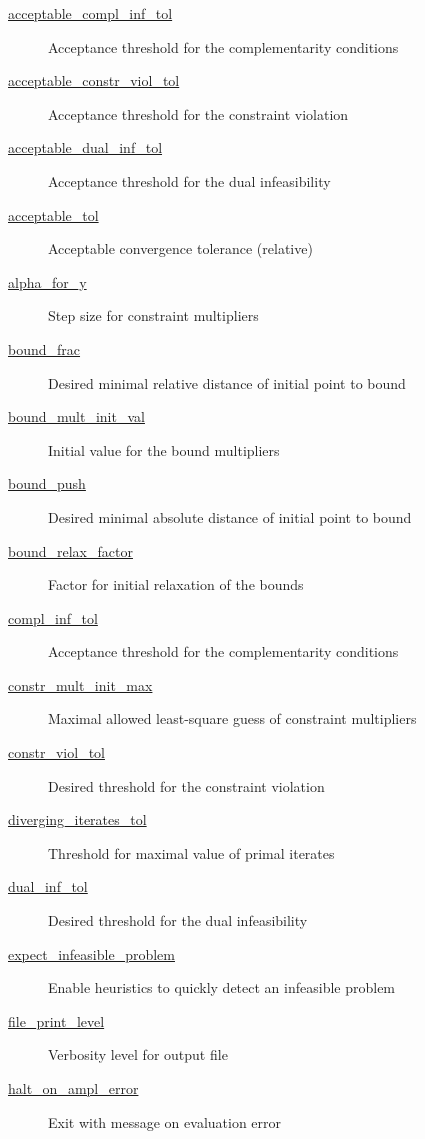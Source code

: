 \begin{description}
\item[{\hyperref[sec:acceptable_compl_inf_tol]{acceptable\_compl\_inf\_tol}}] Acceptance threshold for the complementarity conditions
\item[{\hyperref[sec:acceptable_constr_viol_tol]{acceptable\_constr\_viol\_tol}}] Acceptance threshold for the constraint violation
\item[{\hyperref[sec:acceptable_dual_inf_tol]{acceptable\_dual\_inf\_tol}}] Acceptance threshold for the dual infeasibility
\item[{\hyperref[sec:acceptable_tol]{acceptable\_tol}}] Acceptable convergence tolerance (relative)
\item[{\hyperref[sec:alpha_for_y]{alpha\_for\_y}}] Step size for constraint multipliers
\item[{\hyperref[sec:bound_frac]{bound\_frac}}] Desired minimal relative distance of initial point to bound
\item[{\hyperref[sec:bound_mult_init_val]{bound\_mult\_init\_val}}] Initial value for the bound multipliers
\item[{\hyperref[sec:bound_push]{bound\_push}}] Desired minimal absolute distance of initial point to bound
\item[{\hyperref[sec:bound_relax_factor]{bound\_relax\_factor}}] Factor for initial relaxation of the bounds
\item[{\hyperref[sec:compl_inf_tol]{compl\_inf\_tol}}] Acceptance threshold for the complementarity conditions
\item[{\hyperref[sec:constr_mult_init_max]{constr\_mult\_init\_max}}] Maximal allowed least-square guess of constraint multipliers
\item[{\hyperref[sec:constr_viol_tol]{constr\_viol\_tol}}] Desired threshold for the constraint violation
\item[{\hyperref[sec:diverging_iterates_tol]{diverging\_iterates\_tol}}] Threshold for maximal value of primal iterates
\item[{\hyperref[sec:dual_inf_tol]{dual\_inf\_tol}}] Desired threshold for the dual infeasibility
\item[{\hyperref[sec:expect_infeasible_problem]{expect\_infeasible\_problem}}] Enable heuristics to quickly detect an infeasible problem
\item[{\hyperref[sec:file_print_level]{file\_print\_level}}] Verbosity level for output file
\item[{\hyperref[sec:]{halt\_on\_ampl\_error}}] Exit with message on evaluation error

\end{description}
